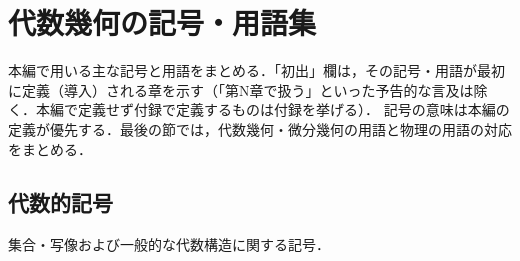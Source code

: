 \chapter{代数幾何の記号・用語集}\label{app:H}

本編で用いる主な記号と用語をまとめる．「初出」欄は，その記号・用語が最初に定義（導入）される章を示す（「第N章で扱う」といった予告的な言及は除く．本編で定義せず付録で定義するものは付録を挙げる）．
記号の意味は本編の定義が優先する．最後の節では，代数幾何・微分幾何の用語と物理の用語の対応をまとめる．

\newcommand{\appHtablehead}{\textbf{記号} & \textbf{意味} & \textbf{初出}\\ \hline}

\section{代数的記号}

集合・写像および一般的な代数構造に関する記号．

